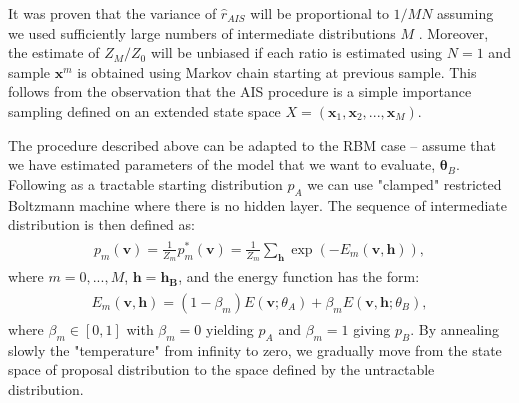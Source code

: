 It was proven that the variance of $\hat{r}_{AIS}$ will be proportional to $1 / MN$ assuming we used sufficiently large numbers of intermediate distributions $M$ \cite{neal2001annealed}. Moreover, the estimate of $Z_M / Z_0$ will be unbiased if each ratio is estimated using $N=1$ and sample $\mathbf{x}^{m}$ is obtained using Markov chain starting at previous sample. This follows from the observation that the AIS procedure is a simple importance sampling defined on an extended state space $X = (\mathbf{x}_1, \mathbf{x}_2, ..., \mathbf{x}_M)$.

The procedure described above can be adapted to the RBM case -- assume that we have estimated parameters of the model that we want to evaluate,  $\mathbf{\theta}_B$. Following \cite{salakhutdinov2008quantitative} as a tractable starting distribution $p_A$ we can use "clamped" restricted Boltzmann machine where there is no hidden layer. The sequence of intermediate distribution is then defined as:
 \begin{align}
\begin{split}
p_m(\mathbf{v}) = \frac{1}{Z_m}p^*_m(\mathbf{v}) = \frac{1}{Z_m}\sum_\mathbf{h} \exp(-E_m(\mathbf{v, h})),
\end{split}
\end{align}
where $m = 0, ..., M$, $\mathbf{h} = \mathbf{h_B}$, and the energy function has the form:
 \begin{align}
\begin{split}
E_m(\mathbf{v,h}) = (1- \beta_m) E(\mathbf{v} ;\theta_A) + \beta_m E(\mathbf{v, h} ;\theta_B),
\end{split}
\end{align}
where $\beta_m \in [0, 1]$ with $\beta_m = 0$ yielding $p_A$ and $\beta_m = 1$ giving $p_B$. By annealing slowly the "temperature" from infinity to zero, we gradually move from the state space of proposal distribution to the space defined by the untractable distribution.

